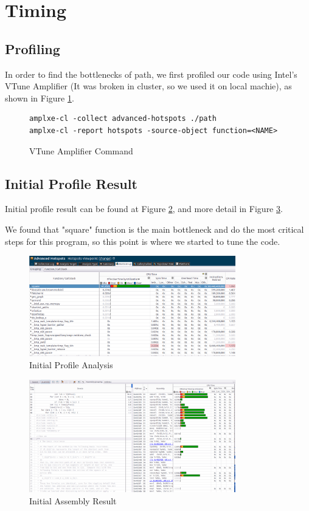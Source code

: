 \section{Timing}\label{sec:timing}
\subsection{Profiling}
In order to find the bottlenecks of path, we first profiled our code
using Intel's VTune Amplifier (It was broken in cluster, so we used
it on local machie), as shown in Figure \ref{amplxe-command}.

\begin{figure}[h]
\footnotesize
\begin{verbatim}
amplxe-cl -collect advanced-hotspots ./path
amplxe-cl -report hotspots -source-object function=<NAME>
\end{verbatim}
\caption{VTune Amplifier Command}
\label{amplxe-command}
\end{figure}

\subsection{Initial Profile Result}
Initial profile result can be found at Figure \ref{initial_profile_result_0},
and more detail in Figure \ref{initial_profile_result_1}.

We found that "square" function is the main bottleneck and do the most critical
steps for this program, so this point is where we started to tune the code.

\begin{figure}[h]
    \centering
    \includegraphics[width=0.8\textwidth]{figs/0_analysis.png}
    \caption{Initial Profile Analysis}
    \label{initial_profile_result_0}
\end{figure}

\begin{figure}[h]
    \centering
    \includegraphics[width=0.8\textwidth]{figs/0_assembly.png}
    \caption{Initial Assembly Result}
    \label{initial_profile_result_1}
\end{figure}

